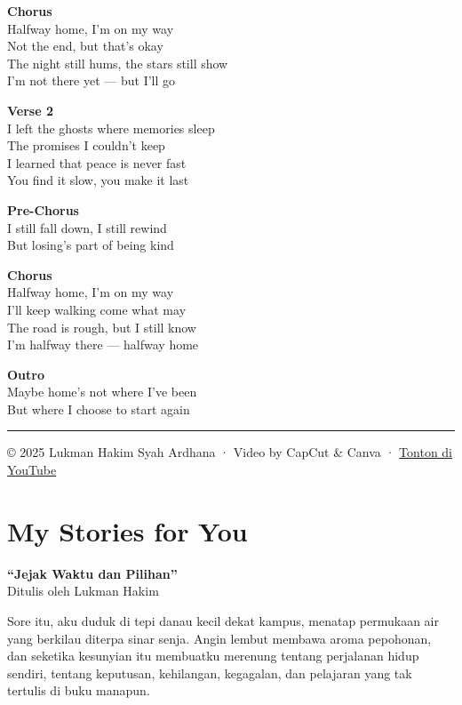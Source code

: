\documentclass[
  letterpaper,
  DIV=11,
  numbers=noendperiod]{scrreprt}
\begin{document}
\textbf{Chorus}\\
Halfway home, I'm on my way\\
Not the end, but that's okay\\
The night still hums, the stars still show\\
I'm not there yet --- but I'll go

\textbf{Verse 2}\\
I left the ghosts where memories sleep\\
The promises I couldn't keep\\
I learned that peace is never fast\\
You find it slow, you make it last

\textbf{Pre-Chorus}\\
I still fall down, I still rewind\\
But losing's part of being kind

\textbf{Chorus}\\
Halfway home, I'm on my way\\
I'll keep walking come what may\\
The road is rough, but I still know\\
I'm halfway there --- halfway home

\textbf{Outro}\\
Maybe home's not where I've been\\
But where I choose to start again

\begin{center}\rule{0.5\linewidth}{0.5pt}\end{center}

© 2025 Lukman Hakim Syah Ardhana · Video by CapCut \& Canva ·
\href{https://youtu.be/qKywgE79b1Q}{Tonton di YouTube}


\chapter{My Stories for You}\label{my-stories-for-you}

\textbf{``Jejak Waktu dan Pilihan''}\\
Ditulis oleh Lukman Hakim

Sore itu, aku duduk di tepi danau kecil dekat kampus, menatap permukaan
air yang berkilau diterpa sinar senja. Angin lembut membawa aroma
pepohonan, dan seketika kesunyian itu membuatku merenung tentang
perjalanan hidup sendiri, tentang keputusan, kehilangan, kegagalan, dan
pelajaran yang tak tertulis di buku manapun.
\end{document}
